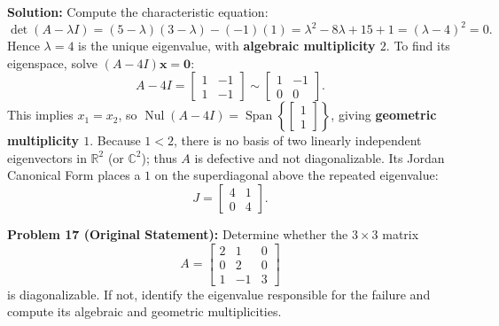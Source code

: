\documentclass[11pt, letterpaper]{article}
\theoremstyle{definition}
\theoremstyle{remark}
\begin{document}
\textbf{Solution:}
Compute the characteristic equation:
\[
\det(A - \lambda I) = (5 - \lambda)(3 - \lambda) - (-1)(1) = \lambda^{2} - 8\lambda + 15 + 1 = (\lambda - 4)^{2} = 0.
\]
Hence $\lambda = 4$ is the unique eigenvalue, with \textbf{algebraic multiplicity $2$}. To find its eigenspace, solve $(A - 4I)\mathbf{x} = \mathbf{0}$:
\[
A - 4I = \begin{bmatrix} 1 & -1 \\ 1 & -1 \end{bmatrix} \sim \begin{bmatrix} 1 & -1 \\ 0 & 0 \end{bmatrix}.
\]
This implies $x_{1} = x_{2}$, so $\operatorname{Nul}(A - 4I) = \operatorname{Span}\left\{\begin{bmatrix} 1 \\ 1 \end{bmatrix}\right\}$, giving \textbf{geometric multiplicity $1$}. Because $1 < 2$, there is no basis of two linearly independent eigenvectors in $\mathbb{R}^{2}$ (or $\mathbb{C}^{2}$); thus $A$ is defective and not diagonalizable. Its Jordan Canonical Form places a $1$ on the superdiagonal above the repeated eigenvalue:
\[
J = \begin{bmatrix} 4 & 1 \\ 0 & 4 \end{bmatrix}.
\]

\vspace{0.8em}
\textbf{Problem 17 (Original Statement):}
Determine whether the $3 \times 3$ matrix
\[
A = \begin{bmatrix} 2 & 1 & 0 \\ 0 & 2 & 0 \\ 1 & -1 & 3 \end{bmatrix}
\]
is diagonalizable. If not, identify the eigenvalue responsible for the failure and compute its algebraic and geometric multiplicities.
\end{document}
